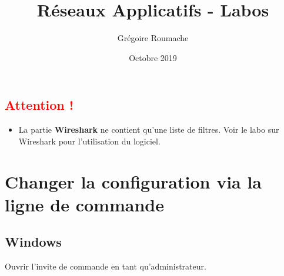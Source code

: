 \documentclass[a4paper]{article}
\title{Réseaux Applicatifs - Labos}
\author{Grégoire Roumache}
\date{Octobre 2019}
\begin{document}
\maketitle

\tableofcontents















\textcolor{red}{\section{Attention !}}

\begin{itemize}
    \item La partie \textbf{Wireshark} ne contient qu'une liste de filtres. Voir le labo sur Wireshark pour l'utilisation du logiciel.
\end{itemize}















\section{Changer la configuration via la ligne de commande}










\subsection{Windows}





\begin{example}
    Ouvrir l'invite de commande en tant qu'administrateur.    
\end{example}
\end{document}
